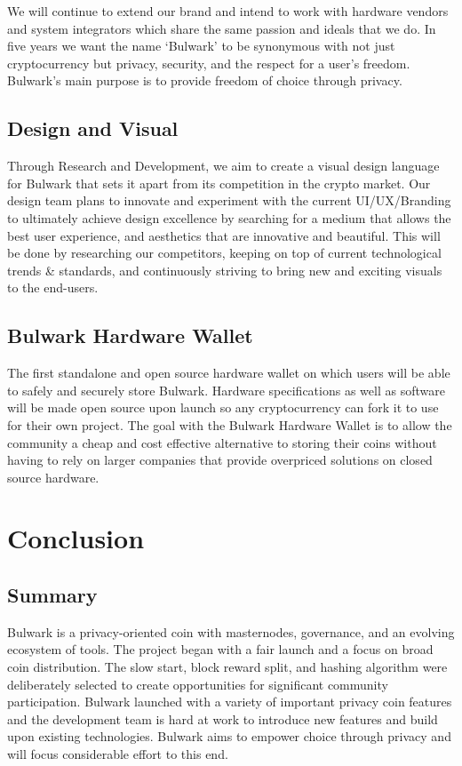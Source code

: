 \documentclass[11pt,a4paperpaper,]{report}
\begin{document}
We will continue to extend our brand and intend to work with hardware
vendors and system integrators which share the same passion and ideals
that we do. In five years we want the name `Bulwark' to be synonymous
with not just cryptocurrency but privacy, security, and the respect for
a user's freedom. Bulwark's main purpose is to provide freedom of choice
through privacy.

\section{Design and Visual}\label{design-and-visual}

Through Research and Development, we aim to create a visual design
language for Bulwark that sets it apart from its competition in the
crypto market. Our design team plans to innovate and experiment with the
current UI/UX/Branding to ultimately achieve design excellence by
searching for a medium that allows the best user experience, and
aesthetics that are innovative and beautiful. This will be done by
researching our competitors, keeping on top of current technological
trends \& standards, and continuously striving to bring new and exciting
visuals to the end-users.

\section{Bulwark Hardware Wallet}\label{bulwark-hardware-wallet}

The first standalone and open source hardware wallet on which users will
be able to safely and securely store Bulwark. Hardware specifications as
well as software will be made open source upon launch so any
cryptocurrency can fork it to use for their own project. The goal with
the Bulwark Hardware Wallet is to allow the community a cheap and cost
effective alternative to storing their coins without having to rely on
larger companies that provide overpriced solutions on closed source
hardware.

\chapter{Conclusion}\label{conclusion}

\section{Summary}\label{summary}

Bulwark is a privacy-oriented coin with masternodes, governance, and an
evolving ecosystem of tools. The project began with a fair launch and a
focus on broad coin distribution. The slow start, block reward split,
and hashing algorithm were deliberately selected to create opportunities
for significant community participation. Bulwark launched with a variety
of important privacy coin features and the development team is hard at
work to introduce new features and build upon existing technologies.
Bulwark aims to empower choice through privacy and will focus
considerable effort to this end.
\end{document}
